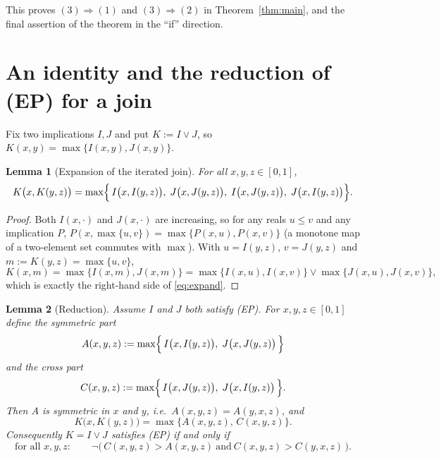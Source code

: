 \documentclass{amsart}
\theoremstyle{plain}
\newtheorem{lemma}{Lemma}
\theoremstyle{definition}
\begin{document}
This proves $(3)\Rightarrow(1)$ and $(3)\Rightarrow(2)$ in Theorem~\ref{thm:main}, and the
final assertion of the theorem in the ``if'' direction.

\section{An identity and the reduction of (EP) for a join}

Fix two implications $I,J$ and put $K:=I\vee J$, so $K(x,y)=\max\{I(x,y),J(x,y)\}$.

\begin{lemma}[Expansion of the iterated join]\label{lem:identity}
For all $x,y,z\in[0,1]$,
\begin{equation}\label{eq:expand}
K\bigl(x,K(y,z)\bigr)=\max\Bigl\{\,I\bigl(x,I(y,z)\bigr),\;J\bigl(x,J(y,z)\bigr),\;
I\bigl(x,J(y,z)\bigr),\;J\bigl(x,I(y,z)\bigr)\Bigr\}.
\end{equation}
\end{lemma}

\begin{proof}
Both $I(x,\cdot)$ and $J(x,\cdot)$ are increasing, so for any reals $u\le v$ and any
implication $P$, $P(x,\max\{u,v\})=\max\{P(x,u),P(x,v)\}$ (a monotone map of a
two-element set commutes with $\max$). With $u=I(y,z)$, $v=J(y,z)$ and
$m:=K(y,z)=\max\{u,v\}$,
\[
K(x,m)=\max\{I(x,m),J(x,m)\}
      =\max\{I(x,u),I(x,v)\}\vee\max\{J(x,u),J(x,v)\},
\]
which is exactly the right-hand side of \eqref{eq:expand}.
\end{proof}

\begin{lemma}[Reduction]\label{lem:reduction}
Assume $I$ and $J$ both satisfy \textup{(EP)}. For $x,y,z\in[0,1]$ define the
\emph{symmetric part}
\[
A(x,y,z):=\max\Bigl\{\,I\bigl(x,I(y,z)\bigr),\;J\bigl(x,J(y,z)\bigr)\,\Bigr\}
\]
and the \emph{cross part}
\[
C(x,y,z):=\max\Bigl\{\,I\bigl(x,J(y,z)\bigr),\;J\bigl(x,I(y,z)\bigr)\,\Bigr\}.
\]
Then $A$ is symmetric in $x$ and $y$, i.e.\ $A(x,y,z)=A(y,x,z)$, and
\begin{equation}\label{eq:KK}
K\bigl(x,K(y,z)\bigr)=\max\{A(x,y,z),\,C(x,y,z)\}.
\end{equation}
Consequently $K=I\vee J$ satisfies \textup{(EP)} if and only if
\begin{equation}\label{eq:star}
\text{for all }x,y,z:\qquad
\neg\bigl(\,C(x,y,z)>A(x,y,z)\ \text{and}\ C(x,y,z)>C(y,x,z)\,\bigr).
\tag{$\star$}
\end{equation}
\end{lemma}
\end{document}
